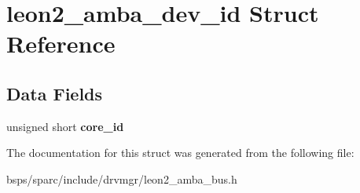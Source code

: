 \hypertarget{structleon2__amba__dev__id}{}\section{leon2\+\_\+amba\+\_\+dev\+\_\+id Struct Reference}
\label{structleon2__amba__dev__id}
\subsection*{Data Fields}
\begin{DoxyCompactItemize}
\item 
\mbox{\label{structleon2__amba__dev__id_a095560521d1561f94b83c38f88563bc8}} 
unsigned short {\bfseries core\+\_\+id}
\end{DoxyCompactItemize}


The documentation for this struct was generated from the following file\+:\begin{DoxyCompactItemize}
\item 
bsps/sparc/include/drvmgr/leon2\+\_\+amba\+\_\+bus.\+h\end{DoxyCompactItemize}
